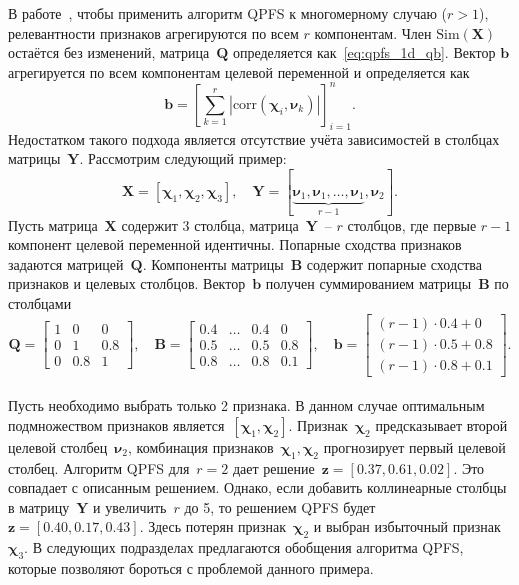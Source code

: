 \documentclass[preprint,12pt]{elsarticle}
\theoremstyle{definition}
\newcommand{\bz}{\mathbf{z}}
\newcommand{\bb}{\mathbf{b}}
\newcommand{\bY}{\mathbf{Y}}
\newcommand{\bX}{\mathbf{X}}
\newcommand{\bB}{\mathbf{B}}
\newcommand{\bQ}{\mathbf{Q}}
\newcommand{\bchi}{\boldsymbol{\chi}}
\newcommand{\bnu}{\boldsymbol{\nu}}
\begin{document}
В работе~\cite{motrenko2018multi}, чтобы применить алгоритм QPFS к многомерному случаю ($r > 1$), релевантности признаков агрегируются по всем $r$ компонентам. Член $\text{Sim}(\bX)$ остаётся без изменений, матрица~$\bQ$ определяется как~\eqref{eq:qpfs_1d_qb}. Вектор $\bb$ агрегируется по всем компонентам целевой переменной и определяется как
\begin{equation*}
\bb = \left[\sum_{k=1}^r|\text{corr}(\bchi_i, \bnu_k)|\right]_{i=1}^n.
\end{equation*}
Недостатком такого подхода является отсутствие учёта зависимостей в столбцах матрицы~$\bY$. Рассмотрим следующий пример:
\begin{equation*}
\bX = [\bchi_1, \bchi_2, \bchi_3], \quad \bY = [\underbrace{\bnu_1, \bnu_1, \dots, \bnu_1}_{r-1}, \bnu_2].
\end{equation*}
Пусть матрица~$\bX$ содержит 3 столбца, матрица~$\bY$~-- $r$ столбцов, где первые $r-1$ компонент целевой переменной идентичны.
Попарные сходства признаков задаются матрицей~$\bQ$.
Компоненты матрицы~$\bB$ содержит попарные сходства признаков и целевых столбцов.
Вектор~$\bb$ получен суммированием матрицы~$\bB$ по столбцами
\begin{equation}
\bQ = \begin{bmatrix} 1 & 0 & 0\\ 0 & 1 & 0.8 \\ 0 & 0.8 & 1 \end{bmatrix}, \quad
\bB = \begin{bmatrix} 0.4 & \dots & 0.4 & 0 \\ 0.5 & \dots & 0.5 & 0.8 \\ 0.8 & \dots & 0.8 & 0.1 \end{bmatrix}, \quad
\bb = \begin{bmatrix} (r-1) \cdot 0.4 + 0 \\ (r-1) \cdot 0.5 + 0.8 \\ (r-1) \cdot 0.8 + 0.1 \end{bmatrix}.
\label{eq:qpfs_example}
\end{equation}
\vspace{0.5cm} \\
Пусть необходимо выбрать только 2 признака.
В данном случае оптимальным подмножеством признаков является~$[\bchi_1, \bchi_2]$.
Признак~$\bchi_2$ предсказывает второй целевой столбец~$\bnu_2$, комбинация признаков~$\bchi_1, \bchi_2$ прогнозирует первый целевой столбец.
Алгоритм QPFS для~$r=2$ дает решение~$\bz = [0.37, 0.61, 0.02]$. Это совпадает с описанным решением.
Однако, если добавить коллинеарные столбцы в матрицу~$\bY$ и увеличить~$r$ до 5, то решением QPFS будет~$\bz = [0.40, 0.17, 0.43]$.
Здесь потерян признак~$\bchi_2$ и выбран избыточный признак~$\bchi_3$.
В следующих подразделах предлагаются обобщения алгоритма QPFS, которые позволяют бороться с проблемой данного примера.
\end{document}
